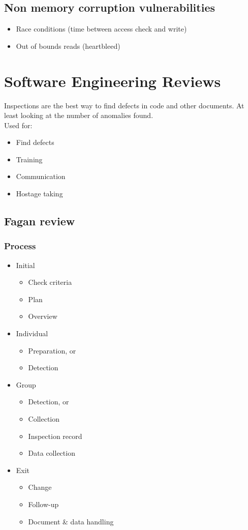 \documentclass[course, english]{Notes}
\begin{document}
\subsection{Non memory corruption vulnerabilities}

\begin{itemize}
	\item Race conditions (time between access check and write)
	\item Out of bounds reads (heartbleed)
\end{itemize}


\section{Software Engineering Reviews}
Inspections are the best way to find defects in code and other documents. At
least looking at the number of anomalies found.\\
Used for:
\begin{itemize}
	\item Find defects
	\item Training
	\item Communication
	\item Hostage taking
\end{itemize}

\subsection{Fagan review}
\subsubsection{Process}
\begin{itemize}
	\item Initial
		\begin{itemize}
			\item Check criteria
			\item Plan
			\item Overview
		\end{itemize}
	\item Individual
		\begin{itemize}
			\item Preparation, or
			\item Detection
		\end{itemize}
	\item Group
		\begin{itemize}
			\item Detection, or
			\item Collection
			\item Inspection record
			\item Data collection
		\end{itemize}
	\item Exit
		\begin{itemize}
			\item Change
			\item Follow-up
			\item Document \& data handling
		\end{itemize}
\end{itemize}
\end{document}
